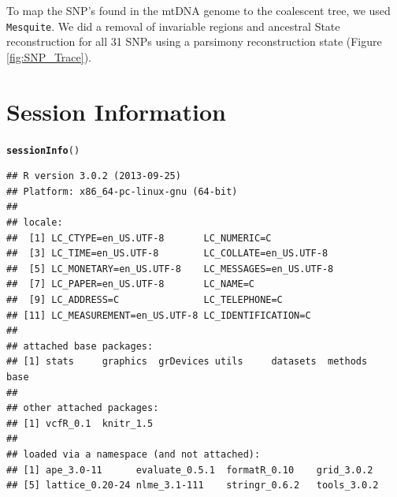 \documentclass{article}\usepackage[]{graphicx}\usepackage[]{color}
\makeatletter
\newcommand{\hlstd}[1]{\textcolor[rgb]{0.345,0.345,0.345}{#1}}%
\newcommand{\hlkwd}[1]{\textcolor[rgb]{0.737,0.353,0.396}{\textbf{#1}}}%
\newenvironment{kframe}{%
 \def\at@end@of@kframe{}%
 \ifinner\ifhmode%
  \def\at@end@of@kframe{\end{minipage}}%
  \begin{minipage}{\columnwidth}%
 \fi\fi%
 \def\FrameCommand##1{\hskip\@totalleftmargin \hskip-\fboxsep
 \colorbox{shadecolor}{##1}\hskip-\fboxsep
     \hskip-\linewidth \hskip-\@totalleftmargin \hskip\columnwidth}%
 \MakeFramed {\advance\hsize-\width
   \@totalleftmargin\z@ \linewidth\hsize
   \@setminipage}}%
 {\par\unskip\endMakeFramed%
 \at@end@of@kframe}
\newenvironment{knitrout}{}{} %
\makeatother
\begin{document}
To map the SNP's found in the mtDNA genome to the coalescent tree, we used \texttt{Mesquite}. We did a removal of invariable regions and ancestral State reconstruction for all 31 SNPs using a parsimony reconstruction state (Figure \ref{fig:SNP_Trace}).




\vspace{24pt}


\section{Session Information}

\begin{knitrout}
\color{fgcolor}\begin{kframe}
\begin{alltt}
\hlkwd{sessionInfo}\hlstd{()}
\end{alltt}
\begin{verbatim}
## R version 3.0.2 (2013-09-25)
## Platform: x86_64-pc-linux-gnu (64-bit)
## 
## locale:
##  [1] LC_CTYPE=en_US.UTF-8       LC_NUMERIC=C              
##  [3] LC_TIME=en_US.UTF-8        LC_COLLATE=en_US.UTF-8    
##  [5] LC_MONETARY=en_US.UTF-8    LC_MESSAGES=en_US.UTF-8   
##  [7] LC_PAPER=en_US.UTF-8       LC_NAME=C                 
##  [9] LC_ADDRESS=C               LC_TELEPHONE=C            
## [11] LC_MEASUREMENT=en_US.UTF-8 LC_IDENTIFICATION=C       
## 
## attached base packages:
## [1] stats     graphics  grDevices utils     datasets  methods   base     
## 
## other attached packages:
## [1] vcfR_0.1  knitr_1.5
## 
## loaded via a namespace (and not attached):
## [1] ape_3.0-11      evaluate_0.5.1  formatR_0.10    grid_3.0.2     
## [5] lattice_0.20-24 nlme_3.1-111    stringr_0.6.2   tools_3.0.2
\end{verbatim}
\end{kframe}
\end{knitrout}






\end{document}
